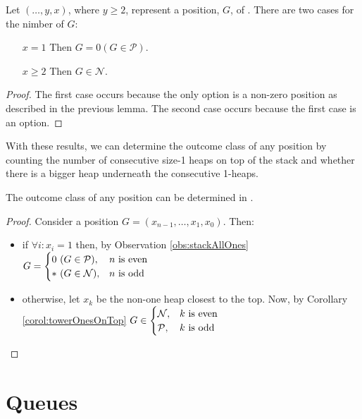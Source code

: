 \documentclass[letter,10pt]{article}
\newcommand{\fuzzy}{\ensuremath{\mathcal{N}}}
\newcommand{\zero}{\ensuremath{\mathcal{P}}}
\begin{document}
\begin{corollary}
	Let $(\ldots, y, x)$, where $y \geq 2$, represent a position, $G$, of .  There are two cases for the nimber of $G$:
	\begin{itemize}
		\item[$x = 1$] Then $G = 0 (G \in \zero)$.
		\item[$x \geq 2$] Then $G \in \fuzzy$.
	\end{itemize}
\end{corollary}
\begin{proof}
	The first case occurs because the only option is a non-zero position as described in the previous lemma.  The second case occurs because the first case is an option.
\end{proof}

With these results, we can determine the outcome class of any position by counting the number of consecutive size-1 heaps on top of the stack and whether there is a bigger heap underneath the consecutive 1-heaps. 

\begin{corollary}
    The outcome class of any  position can be determined in .
\end{corollary}

\begin{proof}
    Consider a  position $G = (x_{n-1}, \ldots, x_1, x_0)$.  Then:
    \begin{itemize}
        \item if $\forall i: x_i = 1$ then, by Observation \ref{obs:stackAllOnes} $G = 
            \begin{cases}
                0\ (G \in \zero), & n \mbox{ is even}\cr
                *\ (G \in \fuzzy), & n \mbox{ is odd}
            \end{cases}$
\item otherwise, let $x_k$ be the non-one heap closest to the top.  Now, by Corollary \ref{corol:towerOnesOnTop} $G \in
            \begin{cases}
                \fuzzy, & k \mbox{ is even}\cr
                \zero, & k \mbox{ is odd}
            \end{cases}$
    \end{itemize}
\end{proof}

\section{Queues}
\label{section:queues}
\end{document}
